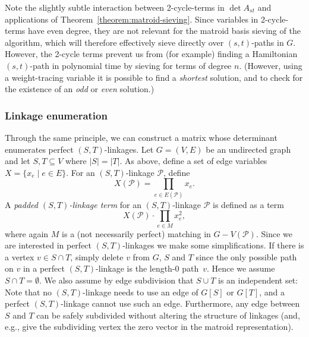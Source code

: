 \documentclass{theoretics}
\newcommand{\cP}{\ensuremath{\mathcal P}\xspace}
\begin{document}
Note the slightly subtle interaction between 2-cycle-terms in $\det A_{st}$
and applications of Theorem~\ref{theorem:matroid-sieving}. Since variables
in 2-cycle-terms have even degree, they are not relevant for the matroid basis
sieving of the algorithm, which will therefore effectively sieve
directly over $(s,t)$-paths in $G$. However, the 2-cycle terms prevent us
from (for example) finding a Hamiltonian $(s,t)$-path in polynomial time
by sieving for terms of degree $n$. (However, using a weight-tracing
variable it is possible to find a \emph{shortest} solution, and to
check for the existence of an \emph{odd} or \emph{even} solution.)

\subsubsection{Linkage enumeration}

Through the same principle, we can construct a matrix whose
determinant enumerates perfect $(S,T)$-linkages. Let $G=(V,E)$
be an undirected graph and let $S, T \subseteq V$ where $|S|=|T|$.
As above, define a set of edge variables $X=\{x_e \mid e \in E\}$.
For an $(S,T)$-linkage $\cP$, define
\[
  X(\cP) = \prod_{e \in E(\cP)} x_e.
\]
A \emph{padded $(S,T)$-linkage term} for an $(S,T)$-linkage $\cP$ is
defined as a term 
\[
  X(\cP) \cdot \prod_{e \in M} x_e^2,
\]
where again $M$ is a (not necessarily perfect) matching in $G-V(\cP)$.
Since we are interested in perfect $(S,T)$-linkages we make some
simplifications. If there is a vertex $v \in S \cap T$, simply
delete $v$ from $G$, $S$ and $T$ since the only possible path on $v$
in a perfect $(S,T)$-linkage is the length-0 path~$v$. Hence we assume
$S \cap T = \emptyset$.
We also assume by edge subdivision that $S \cup T$ is an independent set:
Note that no $(S,T)$-linkage needs to use an edge of $G[S]$ or $G[T]$,
and a perfect $(S,T)$-linkage cannot use such an edge.
Furthermore, any edge between $S$ and $T$ can be safely subdivided
without altering the structure of linkages (and, e.g., give the subdividing vertex
the zero vector in the matroid representation).
\end{document}
